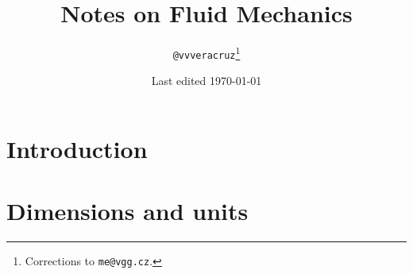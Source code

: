 \documentclass[a4paper]{report}
\title{Notes on Fluid Mechanics}
\date{Last edited \today}
\author{\texttt{@vvveracruz}\thanks{Corrections to \texttt{me@vgg.cz}.}}
\begin{document}
\maketitle

\chapter{Introduction}
  
  


\appendix

\chapter{Dimensions and units}
  



\printbibliography
{}
\end{document}
